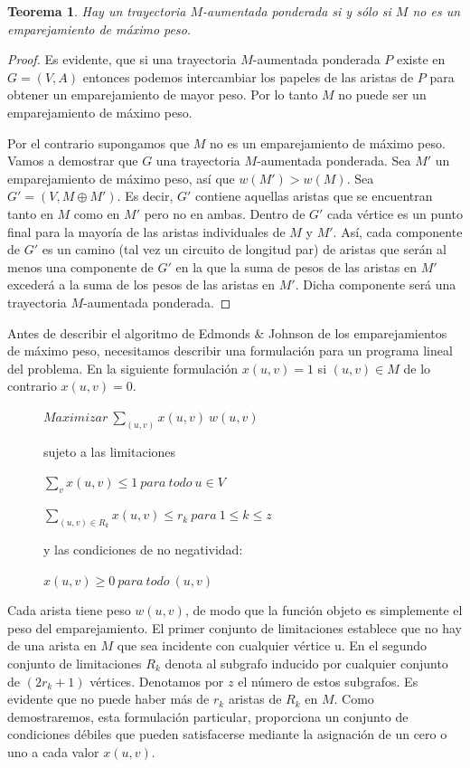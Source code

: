 \documentclass[10pt,a5paper]{book}
\newtheorem{teorema}{Teorema}[chapter]
\begin{document}
\begin{teorema}
Hay un trayectoria $M$-aumentada ponderada si y sólo si $M$ no es un emparejamiento de máximo peso.
\end{teorema}
\begin{proof}
Es evidente, que si una trayectoria $M$-aumentada ponderada $P$ existe en $G = (V,A)$ entonces podemos intercambiar los papeles de las aristas de $P$ para obtener un emparejamiento de mayor peso. Por lo tanto $M$ no puede ser un emparejamiento de máximo peso.

Por el contrario supongamos que $M$ no es un emparejamiento de máximo peso. Vamos a demostrar que $G$ una trayectoria $M$-aumentada ponderada. Sea $M'$ un emparejamiento de máximo peso, así que $w(M') > w(M)$. Sea $G' = (V, M \oplus M')$. Es decir, $G'$ contiene aquellas aristas que se encuentran tanto en $M$ como en $M'$ pero no en ambas. Dentro de $G'$ cada vértice es un punto final para la mayoría de las aristas individuales de $M$ y $M'$. Así, cada componente de $G'$ es un camino (tal vez un circuito de longitud par) de aristas que serán al menos una componente de $G'$ en la que la suma de pesos de las aristas en $M'$ excederá a la suma de los pesos de las aristas en $M'$. Dicha componente será una trayectoria $M$-aumentada ponderada.
\end{proof}

Antes de describir el algoritmo de Edmonds \& Johnson de los emparejamientos de máximo peso, necesitamos describir una formulación para un programa lineal del problema. En la siguiente formulación $x(u,v) = 1$ si $(u,v) \in M$ de lo contrario $x(u,v) = 0$.\\

\begin{description}
\item[] \quad $ Maximizar\ \sum_{(u,v)} x(u,v)\ w(u,v)$
\item[] \quad sujeto a las limitaciones
\item[] \quad $ \sum_v x(u,v) \le 1\ para\ todo\ u \in V $
\item[] \quad $ \sum_{(u,v) \in R_k} x(u,v) \le r_k\ para\ 1 \le k \le z $
\item[] \quad y las condiciones de no negatividad: 
\item[] \quad $ x(u,v) \ge 0\ para\ todo\ (u,v) $
\end{description}

Cada arista tiene peso $w(u,v)$, de modo que la función objeto es simplemente el peso del emparejamiento. El primer conjunto de limitaciones establece que no hay de una arista en $M$ que sea incidente con cualquier vértice u. En el segundo conjunto de limitaciones $R_k$ denota al subgrafo inducido por cualquier conjunto de $(2r_k + 1)$ vértices. Denotamos por $z$ el número de estos subgrafos. Es evidente que no puede haber más de $r_k$ aristas de $R_k$ en $M$. Como demostraremos, esta formulación particular, proporciona un conjunto de condiciones débiles que pueden satisfacerse mediante la asignación de un cero o uno a cada valor $x(u,v)$.
\end{document}
